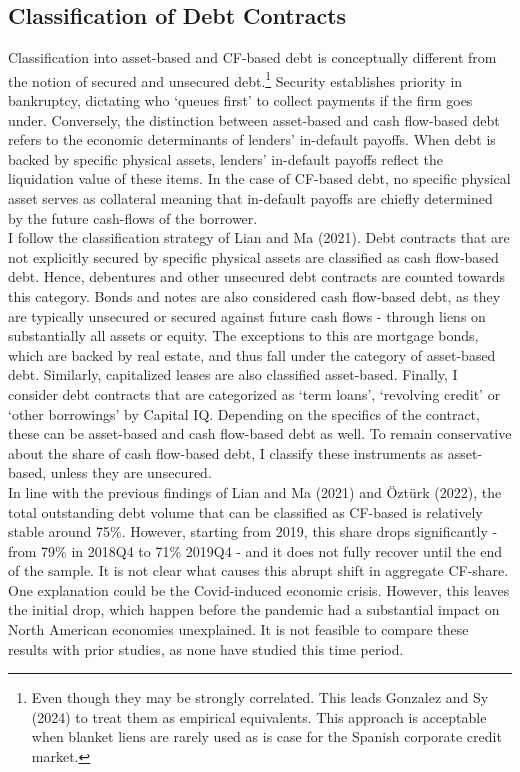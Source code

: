 \documentclass[12pt]{article}
\begin{document}
\subsection{Classification of Debt Contracts \label{sec:classification}}
Classification into asset-based and CF-based debt is conceptually different from the notion of secured and unsecured debt.\footnote{Even though they may be strongly correlated. This leads Gonzalez and Sy (2024) to treat them as empirical equivalents. This approach is acceptable when blanket liens are rarely used  as is case for the Spanish corporate credit market.} Security establishes priority in bankruptcy, dictating who `queues first' to collect payments if the firm goes under. Conversely, the distinction between asset-based and cash flow-based debt refers to the economic determinants of lenders' in-default payoffs. When debt is backed by specific physical assets, lenders' in-default payoffs reflect the liquidation value of these items. In the case of CF-based debt, no specific physical asset serves as collateral meaning that in-default payoffs are chiefly determined by the future cash-flows of the borrower. \vspace{3mm} \\
I follow the classification strategy of Lian and Ma (2021). Debt contracts that are not explicitly secured by specific physical assets are classified as cash flow-based debt. Hence, debentures and other unsecured debt contracts are counted towards this category. Bonds and notes are also considered cash flow-based debt, as they are typically unsecured or secured against future cash flows - through liens on substantially all assets or equity. The exceptions to this are mortgage bonds, which are backed by real estate, and thus fall under the category of asset-based debt. Similarly, capitalized leases are also classified asset-based. Finally, I consider debt contracts that are categorized as `term loans', `revolving credit' or `other borrowings' by Capital IQ. Depending on the specifics of the contract, these can be asset-based and cash flow-based debt as well. To remain conservative about the share of cash flow-based debt, I classify these instruments as asset-based, unless they are unsecured. \vspace{3mm} \\ 
In line with the previous findings of Lian and Ma (2021) and Öztürk (2022), the total outstanding debt volume that can be classified as CF-based is relatively stable around 75\%. However, starting from 2019, this share drops significantly - from 79\% in 2018Q4 to 71\% 2019Q4 - and it does not fully recover until the end of the sample. It is not clear what causes this abrupt shift in aggregate CF-share. One explanation could be the Covid-induced economic crisis. However, this leaves the initial drop, which happen before the pandemic had a substantial impact on North American economies unexplained. It is not feasible to compare these results with prior studies, as none have studied this time period.
\end{document}
